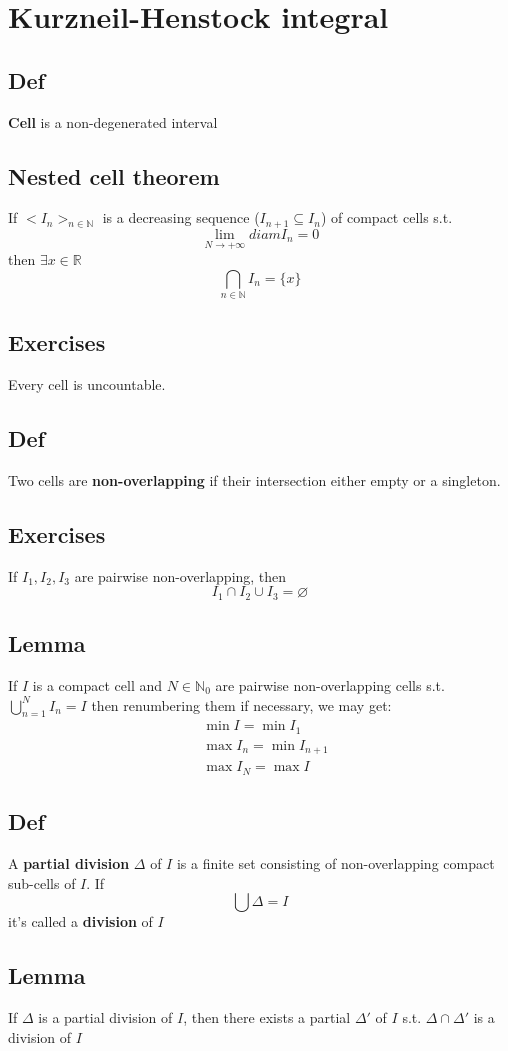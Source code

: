 \documentclass{book}
\begin{document}
\chapter{Kurzneil-Henstock integral}
\section{Def}
\textbf{Cell} is a non-degenerated interval
\section{Nested cell theorem}
If $<I_n>_{n\in \mathbb N}$ is a decreasing sequence ($I_{n+1}\subseteq I_n$) of compact cells s.t.$$\lim\limits_{N\rightarrow +\infty} diam I_n=0$$ then $\exists x\in \mathbb R$$$\bigcap\limits_{n\in \mathbb N}I_n=\{x\}$$
\section{Exercises}
Every cell is uncountable.
\section{Def}
Two cells are \textbf{non-overlapping} if their intersection either empty or a singleton.
\section{Exercises}If $I_1,I_2,I_3$ are pairwise non-overlapping, then $$I_1\cap I_2\cup I_3= \varnothing$$ 
\section{Lemma}
If $I$ is a compact cell and $N\in \mathbb N_0$  are pairwise non-overlapping cells s.t. $\bigcup\limits_{n=1}^N I_n=I$ then renumbering them if necessary, we may get:
$$\begin{aligned}
    &\min I=\min I_1\\ &\max I_n=\min I_{n+1}\\ &\max I_N=\max I
\end{aligned}$$
\section{Def}
A \textbf{partial division} $\Delta$ of $I$ is a finite set consisting of non-overlapping compact sub-cells of $I$. If
$$\bigcup \Delta=I$$
it's called a \textbf{division} of $I$
\section{Lemma}If $\Delta$ is a partial division of $I$, then there exists a partial $\Delta'$ of $I$ s.t. $\Delta\cap\Delta'$ is a division of $I$
\end{document}
